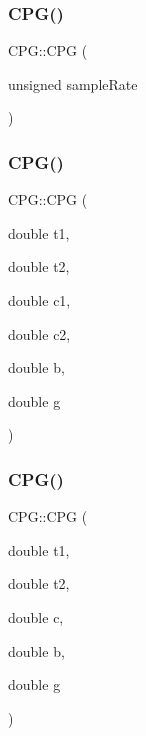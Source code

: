 \subsubsection{\texorpdfstring{C\+P\+G()}{CPG()}\hspace{0.1cm}{\footnotesize\ttfamily [1/4]}}
{\footnotesize\ttfamily C\+P\+G\+::\+C\+PG (\begin{DoxyParamCaption}\item[{unsigned}]{sample\+Rate }\end{DoxyParamCaption})}

\mbox{\label{classCPG_a6e797fd36e726758e82cca4207083c5f}} 
\subsubsection{\texorpdfstring{C\+P\+G()}{CPG()}\hspace{0.1cm}{\footnotesize\ttfamily [2/4]}}
{\footnotesize\ttfamily C\+P\+G\+::\+C\+PG (\begin{DoxyParamCaption}\item[{double}]{t1,  }\item[{double}]{t2,  }\item[{double}]{c1,  }\item[{double}]{c2,  }\item[{double}]{b,  }\item[{double}]{g }\end{DoxyParamCaption})}

\mbox{\label{classCPG_a8543be2f663d6b5e79a97745f0d83cd7}} 
\subsubsection{\texorpdfstring{C\+P\+G()}{CPG()}\hspace{0.1cm}{\footnotesize\ttfamily [3/4]}}
{\footnotesize\ttfamily C\+P\+G\+::\+C\+PG (\begin{DoxyParamCaption}\item[{double}]{t1,  }\item[{double}]{t2,  }\item[{double}]{c,  }\item[{double}]{b,  }\item[{double}]{g }\end{DoxyParamCaption})}

